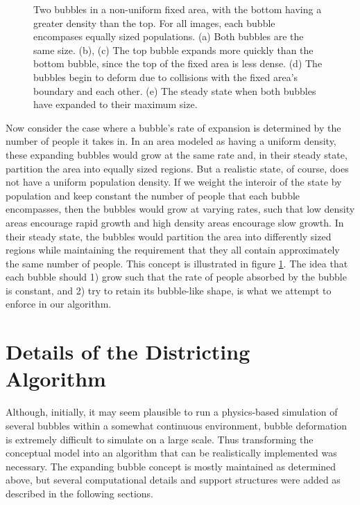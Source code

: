\documentclass[11pt]{article}				%
\begin{document}
\begin{figure}
\begin{center}

\end{center}
\caption{Two bubbles in a non-uniform fixed area, with the bottom having
a greater density than the top. For all images, each bubble encompases
equally sized populations. (a) Both bubbles are the same size. (b), (c)
The top bubble expands more quickly than the bottom bubble, since the top 
of the fixed area is less dense. (d) The bubbles begin to deform due to
collisions with the fixed area's boundary and each other. (e) The steady
state when both bubbles have expanded to their maximum size.}
\label{fig:bubble}
\end{figure}

Now consider the case where a bubble's rate of expansion is determined by 
the number of people it takes in. In an area modeled as having a uniform
density, these expanding bubbles would grow at the same rate and, in
their steady state, partition the area into equally sized regions. But a
realistic state, of course, does not have a uniform population density.
If we weight the interoir of the state by population and keep constant
the number of people that each bubble encompasses, then the bubbles would 
grow at varying rates, such that low density areas encourage rapid growth 
and high density areas encourage slow growth. In their steady state, the
bubbles would partition the area into differently sized regions while
maintaining the requirement that they all contain approximately the same
number of people. This concept is illustrated in figure \ref{fig:bubble}. 
The idea that each bubble should 1) grow such that the rate of people
absorbed by the bubble is constant, and 2) try to retain its bubble-like
shape, is what we attempt to enforce in our algorithm.

\section{Details of the Districting Algorithm}

Although, initially, it may seem plausible to run a physics-based
simulation of several bubbles within a somewhat continuous environment,
bubble deformation is extremely difficult to simulate on a large scale.
Thus transforming the conceptual model into an algorithm that can be
realistically implemented was necessary. The expanding bubble concept is
mostly maintained as determined above, but several computational details
and support structures were added as described in the following sections.
\end{document}
